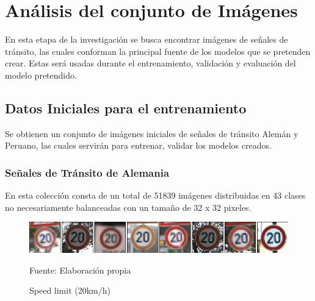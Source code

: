\section{Análisis del conjunto de Imágenes}
	
	En esta etapa de la investigación se busca encontrar imágenes de señales de tránsito, las cuales conforman la principal fuente de los modelos que se pretenden crear. Estas será usadas durante el entrenamiento, validación y evaluación del modelo pretendido.
	
	\subsection{Datos Iniciales para el entrenamiento}
		Se obtienen un conjunto de imágenes iniciales de señales de tránsito Alemán y Peruano, las cuales servirán para entrenar, validar los modelos creados.
		\subsubsection{Señales de Tránsito de Alemania}

			En esta colección consta de un total de 51839 imágenes distribuidas en 43 clases no necesariamente balanceadas con un tamaño de 32 x 32 pixeles.

			\begin{figure}[H]
				\begin{center}
				\includegraphics[width=1\textwidth]{images/desarrollo/imagenes/alemania/1__(1).png}
				\end{center}
				\begin{center}
				\caption{\small{Speed limit (20km/h)}}
				\vskip -0.25cm
				{\small{Fuente: Elaboración propia}}
				\end{center}
				\vspace{-1.5em}
			\end{figure}


